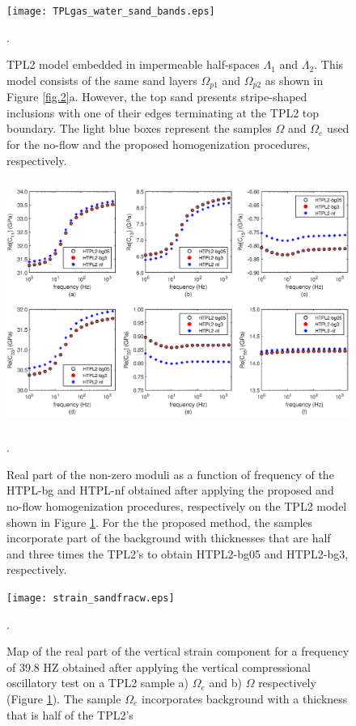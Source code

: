 \documentclass[draft]{agujournal2019}
\begin{document}
\begin{figure}[!ht]
\centering
        \texttt{[image: TPLgas\_water\_sand\_bands.eps]}
\caption{TPL2 model embedded in impermeable half-spaces $\Lambda_1$ and $\Lambda_2$. This model consists of the same sand layers  $\Omega_{p1}$  and $\Omega_{p2}$ as shown in Figure \ref{fig.2}a. However, the top sand presents stripe-shaped inclusions with one of their edges terminating at the TPL2 top boundary. The light blue boxes represent the samples $\Omega$ and $\Omega_e$ used for the no-flow and the proposed homogenization procedures, respectively.}. 
\label{fig.7}
\end{figure}

\begin{figure}[!ht]
\centering
        \includegraphics[width= 120mm, height=80mm]{cij_2sandfracw.eps}
\caption{Real part of the non-zero moduli as a function of frequency of the HTPL-bg and HTPL-nf obtained after applying the proposed and no-flow homogenization procedures, respectively on the TPL2 model shown in Figure \ref{fig.7}. For the the proposed method, the samples incorporate part of the background with thicknesses that are half and three times the TPL2's to obtain HTPL2-bg05 and HTPL2-bg3, respectively. }. 

\label{fig.8}
\end{figure}

\begin{figure}[!ht]
\centering
        \texttt{[image: strain\_sandfracw.eps]}
\caption{Map of the real part of the vertical strain component for a frequency of 39.8 HZ obtained after applying the vertical compressional oscillatory test on a TPL2 sample a) $\Omega_e$  and b) $\Omega$ respectively (Figure \ref{fig.7}). The sample $\Omega_e$ incorporates background with a thickness that is half of the TPL2's }. 
\label{fig.9}
\end{figure}
\end{document}
